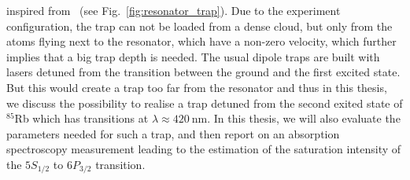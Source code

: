 inspired from~\cite{Thompson1202} (see Fig.~\ref{fig:resonator_trap}). Due to the 
experiment configuration, the trap can not be loaded from a dense cloud, but only 
from the atoms flying next to the resonator, which have a non-zero velocity, which 
further implies that a big trap depth is needed. The usual dipole traps are built 
with lasers detuned from the transition between the ground and the first excited 
state. But this would create a trap too far from the resonator and thus in this 
thesis, we discuss the possibility to realise a trap detuned from the second exited 
state of \(^{85}\)Rb which has transitions at \(\lambda \approx \SI{420}{\nano\meter} \).
In this thesis, we will also evaluate the parameters needed for such a trap, and 
then report on an absorption spectroscopy measurement leading to the estimation 
of the saturation intensity of the \(5S_{1/2}\) to \(6P_{3/2}\) transition.
